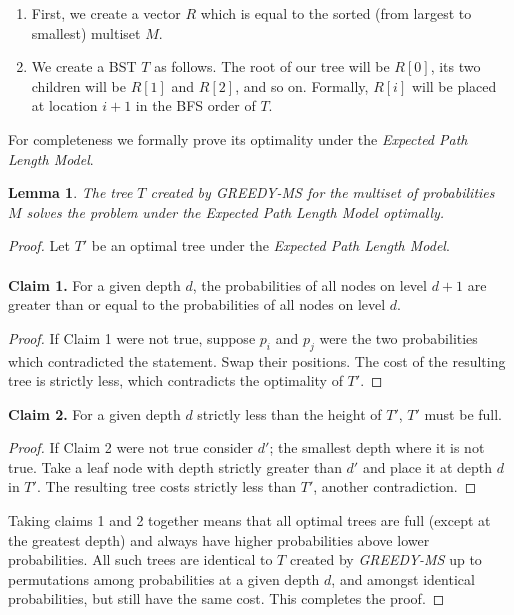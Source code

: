 \documentclass[letterpaper,12pt,titlepage,oneside,final]{book}
\theoremstyle{plain}
\newtheorem{lem}[thm]{Lemma}
\begin{document}
\begin{enumerate}
\item First, we create a vector $R$ which is equal to the sorted (from largest to smallest) multiset $M$.

\item We create a BST $T$ as follows. The root of our tree will be $R[0]$, its two children will be $R[1]$ and $R[2]$, and so on. Formally, $R[i]$ will be placed at location $i+1$ in the BFS order of $T$.
\end{enumerate}

For completeness we formally prove its optimality under the \textit{Expected Path Length Model}. 

\begin{lem}\label{MSSolvesOpt}
The tree $T$ created by \textit{GREEDY-MS} for the multiset of probabilities $M$ solves the problem under the \textit{Expected Path Length Model} optimally.
\end{lem}

\begin{proof}
Let $T'$ be an optimal tree under the \textit{Expected Path Length Model}. \\\\
\noindent \textbf{Claim 1.}\label{Claim-EPL}
For a given depth $d$, the probabilities of all nodes on level $d+1$ are greater than or equal to the probabilities of all nodes on level $d$.
\begin{proof}
If Claim 1 were not true, suppose $p_i$ and $p_j$ were the two probabilities which contradicted the statement. Swap their positions. The cost of the resulting tree is strictly less, which contradicts the optimality of $T'$.
\end{proof}

\noindent \textbf{Claim 2.}\label{Claim-EPL2}
For a given depth $d$ strictly less than the height of $T'$, $T'$ must be full.
\begin{proof}
If Claim 2 were not true consider $d'$; the smallest depth where it is not true. Take a leaf node with depth strictly greater than $d'$ and place it at depth $d$ in $T'$. The resulting tree costs strictly less than $T'$, another contradiction.
\end{proof}

Taking claims 1 and 2 together means that all optimal trees are full (except at the greatest depth) and always have higher probabilities above lower probabilities. All such trees are identical to $T$ created by \textit{GREEDY-MS} up to permutations among probabilities at a given depth $d$, and amongst identical probabilities, but still have the same cost. This completes the proof.

\end{proof}
\end{document}
